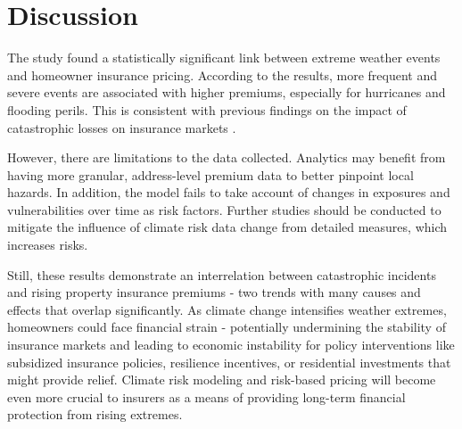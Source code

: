 \documentclass[12pt]{article}
\begin{document}
  


\section{Discussion}
\label{sec:disc}

The study found a statistically significant link between extreme weather events and homeowner insurance pricing. According to the 
results, more frequent and severe events are associated with higher premiums, especially for hurricanes and flooding perils. This is 
consistent with previous findings on the impact of catastrophic losses on insurance markets \cite{aon}.

However, there are limitations to the data collected. Analytics may benefit from having more granular, address-level premium data to 
better pinpoint local hazards. In addition, the model fails to take account of changes in exposures and vulnerabilities over time as risk 
factors. Further studies should be conducted to mitigate the influence of climate risk data change from detailed measures, which 
increases risks.

Still, these results demonstrate an interrelation between catastrophic incidents and rising property insurance premiums - two trends 
with many causes and effects that overlap significantly. As climate change intensifies weather extremes, homeowners could face 
financial strain - potentially undermining the stability of insurance markets and leading to economic instability for policy 
interventions like subsidized insurance policies\cite{iii}, resilience incentives, or residential investments\cite{kousky} that 
might provide relief. Climate risk modeling and risk-based pricing will become even more crucial to insurers as a means of providing 
long-term financial protection from rising extremes.






\end{document}
